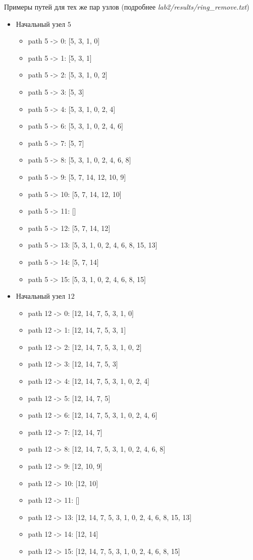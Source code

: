 \documentclass[a4paper,12pt]{article}
\begin{document}
    Примеры путей для тех же пар узлов (подробнее \textsl{lab2/results/ring\_remove.txt})
    \begin{itemize}
        \item Начальный узел $ 5 $
        \begin{itemize}
            \item path 5 -> 0: [5, 3, 1, 0]
            \item path 5 -> 1: [5, 3, 1]
            \item path 5 -> 2: [5, 3, 1, 0, 2]
            \item path 5 -> 3: [5, 3]
            \item path 5 -> 4: [5, 3, 1, 0, 2, 4]
            \item path 5 -> 6: [5, 3, 1, 0, 2, 4, 6]
            \item path 5 -> 7: [5, 7]
            \item path 5 -> 8: [5, 3, 1, 0, 2, 4, 6, 8]
            \item path 5 -> 9: [5, 7, 14, 12, 10, 9]
            \item path 5 -> 10: [5, 7, 14, 12, 10]
            \item path 5 -> 11: []
            \item path 5 -> 12: [5, 7, 14, 12]
            \item path 5 -> 13: [5, 3, 1, 0, 2, 4, 6, 8, 15, 13]
            \item path 5 -> 14: [5, 7, 14]
            \item path 5 -> 15: [5, 3, 1, 0, 2, 4, 6, 8, 15]
        \end{itemize}
        \item Начальный узел $ 12 $
        \begin{itemize}
            \item path 12 -> 0: [12, 14, 7, 5, 3, 1, 0]
            \item path 12 -> 1: [12, 14, 7, 5, 3, 1]
            \item path 12 -> 2: [12, 14, 7, 5, 3, 1, 0, 2]
            \item path 12 -> 3: [12, 14, 7, 5, 3]
            \item path 12 -> 4: [12, 14, 7, 5, 3, 1, 0, 2, 4]
            \item path 12 -> 5: [12, 14, 7, 5]
            \item path 12 -> 6: [12, 14, 7, 5, 3, 1, 0, 2, 4, 6]
            \item path 12 -> 7: [12, 14, 7]
            \item path 12 -> 8: [12, 14, 7, 5, 3, 1, 0, 2, 4, 6, 8]
            \item path 12 -> 9: [12, 10, 9]
            \item path 12 -> 10: [12, 10]
            \item path 12 -> 11: []
            \item path 12 -> 13: [12, 14, 7, 5, 3, 1, 0, 2, 4, 6, 8, 15, 13]
            \item path 12 -> 14: [12, 14]
            \item path 12 -> 15: [12, 14, 7, 5, 3, 1, 0, 2, 4, 6, 8, 15]
        \end{itemize}
    \end{itemize}
\end{document}
